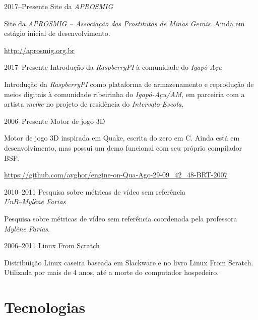 \documentclass[a4paper,twoside]{simplecv}
\begin{document}
\begin{topic}
\item[2017--Presente] Site da \emph{APROSMIG}

	Site da \emph{APROSMIG -- Associação das Prostitutas de Minas Gerais}.
	Ainda em estágio inicial de desenvolvimento.

	{\scriptsize\url{http://aprosmig.org.br}}

\item[2017--Presente] Introdução da \emph{RaspberryPI} à comunidade do \emph{Igapó-Açu}

	Introdução da \emph{RaspberryPI} como plataforma de armazenamento e
	reprodução de meios digitais à comunidade ribeirinha do
	\emph{Igapó-Açu/AM}, em parceiria com a artista \emph{melke} no projeto
	de residência do \emph{Intervalo-Escola}.

\item[2006--Presente] Motor de jogo 3D

	Motor de jogo 3D inspirada em Quake, escrita do zero em C. Ainda está
	em desenvolvimento, mas possui um demo funcional com seu próprio
	compilador BSP.

	{\scriptsize\url{https://github.com/ayghor/engine-on-Qua-Ago-29-09\_42\_48-BRT-2007}}

\item[2010--2011] Pesquisa sobre métricas de vídeo sem referência\\
	{\em\small UnB--Mylène Farias}

	Pesquisa sobre métricas de vídeo sem referência coordenada pela
	professora \emph{Mylène Farias}.

\item[2006--2011] Linux From Scratch

	Distribuição Linux caseira baseada em Slackware e no livro Linux
	From Scratch. Utilizada por mais de 4 anos, até a morte do
	computador hospedeiro.

\end{topic}

\section{Tecnologias}
\end{document}
